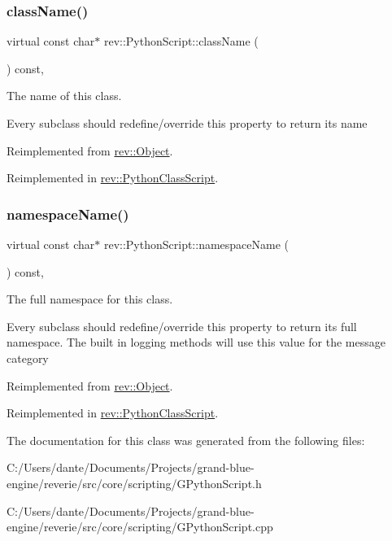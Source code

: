 \subsubsection{\texorpdfstring{className()}{className()}}
{\footnotesize\ttfamily virtual const char$\ast$ rev\+::\+Python\+Script\+::class\+Name (\begin{DoxyParamCaption}{ }\end{DoxyParamCaption}) const\hspace{0.3cm}{\ttfamily [inline]}, {\ttfamily [virtual]}}



The name of this class. 

Every subclass should redefine/override this property to return its name 

Reimplemented from \mbox{\hyperlink{classrev_1_1_object_a7a2013f91169479b65cf93afdc5d9a68}{rev\+::\+Object}}.



Reimplemented in \mbox{\hyperlink{classrev_1_1_python_class_script_adbdcf0106db89f58196a253e5d3b6831}{rev\+::\+Python\+Class\+Script}}.

\mbox{\label{classrev_1_1_python_script_ad8a903fd2749527913565f640e5239d6}} 
\subsubsection{\texorpdfstring{namespaceName()}{namespaceName()}}
{\footnotesize\ttfamily virtual const char$\ast$ rev\+::\+Python\+Script\+::namespace\+Name (\begin{DoxyParamCaption}{ }\end{DoxyParamCaption}) const\hspace{0.3cm}{\ttfamily [inline]}, {\ttfamily [virtual]}}



The full namespace for this class. 

Every subclass should redefine/override this property to return its full namespace. The built in logging methods will use this value for the message category 

Reimplemented from \mbox{\hyperlink{classrev_1_1_object_aaeb638d3e10f361c56c211a318a27f3d}{rev\+::\+Object}}.



Reimplemented in \mbox{\hyperlink{classrev_1_1_python_class_script_a3e596d1eec111c02d431496f6a750701}{rev\+::\+Python\+Class\+Script}}.



The documentation for this class was generated from the following files\+:\begin{DoxyCompactItemize}
\item 
C\+:/\+Users/dante/\+Documents/\+Projects/grand-\/blue-\/engine/reverie/src/core/scripting/G\+Python\+Script.\+h\item 
C\+:/\+Users/dante/\+Documents/\+Projects/grand-\/blue-\/engine/reverie/src/core/scripting/G\+Python\+Script.\+cpp\end{DoxyCompactItemize}
